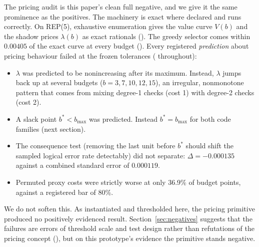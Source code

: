 The pricing audit is this paper's clean full negative, and we give it the same prominence as the positives. The machinery is exact where declared and runs correctly. On REP(5), exhaustive enumeration gives the value curve $V(b)$ and the shadow prices $\lambda(b)$ as exact rationals (\gExact). %
The greedy selector comes within $0.00405$ of the exact curve at every budget (\gMeasured). %
Every registered \emph{prediction} about pricing behaviour failed at the frozen tolerances (\gRegNeg{} throughout): %
\begin{itemize}[nosep]
\item $\lambda$ was predicted to be nonincreasing after its maximum. Instead, $\lambda$ jumps back up at several budgets ($b = 3, 7, 10, 12, 15$), an irregular, nonmonotone pattern that comes from mixing degree-1 checks (cost 1) with degree-2 checks (cost 2). %
\item A slack point $b^{*} < b_{\max}$ was predicted. Instead $b^{*} = b_{\max}$ for both code families (next section). %
\item The consequence test (removing the last unit before $b^{*}$ should shift the sampled logical error rate detectably) did not separate: $\Delta = -0.000135$ against a combined standard error of $0.000119$. %
\item Permuted proxy costs were strictly worse at only 36.9\% of budget points, against a registered bar of 80\%. %
\end{itemize}
We do not soften this. As instantiated and thresholded here, the pricing primitive produced no positively evidenced result. Section~\ref{sec:negatives} suggests that the failures are errors of threshold scale and test design rather than refutations of the pricing concept (\gInterp), but on this prototype's evidence the primitive stands negative.
